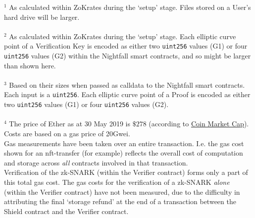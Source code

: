 $^1$ As calculated within ZoKrates during the `setup' stage. Files stored on a User's hard drive will be larger.\\
\\
$^2$ As calculated within ZoKrates during the `setup' stage. Each elliptic curve point of a Verification Key is encoded as either two \texttt{uint256} values (G1) or four \texttt{uint256} values (G2) within the Nightfall smart contracts, and so might be larger than shown here.\\
\\
$^3$ Based on their sizes when passed as calldata to the Nightfall smart contracts. Each input is a \texttt{uint256}. Each elliptic curve point of a Proof is encoded as either two \texttt{uint256} values (G1) or four \texttt{uint256} values (G2).\\
\\
$^{4}$ The price of Ether as at 30 May 2019 is $\$278$ (according to \href{https://coinmarketcap.com/}{Coin Market Cap}). Costs are based on a gas price of 20Gwei.\\
Gas measurements have been taken over an entire transaction. I.e. the gas cost shown for an nft-transfer (for example) reflects the overall cost of computation and storage across \textit{all} contracts involved in that transaction.\\
Verification of the zk-SNARK (within the Verifier contract) forms only a part of this total gas cost. The gas costs for the verification of a zk-SNARK \textit{alone} (within the Verifier contract) have not been measured, due to the difficulty in attributing the final `storage refund' at the end of a transaction between the Shield contract and the Verifier contract.




